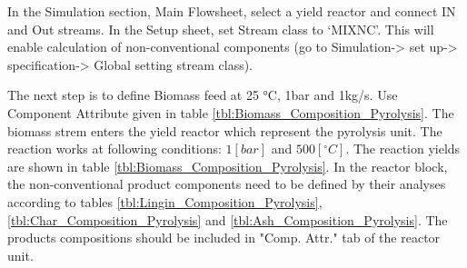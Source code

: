 In the Simulation section, Main Flowsheet, select a yield reactor and connect IN and Out streams. In the Setup sheet, set Stream class to ‘MIXNC’. This will enable calculation of non-conventional components (go to Simulation-> set up-> specification-> Global setting stream class). 

The next step is to define Biomass feed at 25 °C, 1bar and 1kg/s. Use Component Attribute given in table \ref{tbl:Biomass_Composition_Pyrolysis}. The biomass strem enters the yield reactor which represent the pyrolysis unit. The reaction works at following conditions: $1 [bar]$ and $500 [^\circ C]$. The reaction yields are shown in table \ref{tbl:Biomass_Composition_Pyrolysis}. In the reactor block, the non-conventional product components need to be defined by their analyses according to tables \ref{tbl:Lingin_Composition_Pyrolysis}, \ref{tbl:Char_Composition_Pyrolysis} and \ref{tbl:Ash_Composition_Pyrolysis}. The products compositions should be included in "Comp. Attr." tab of the reactor unit.

